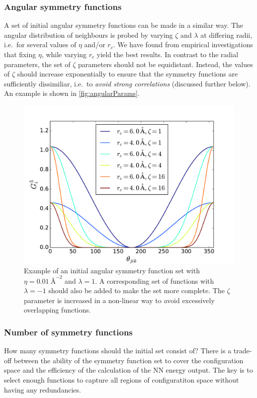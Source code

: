 \documentclass[twoside,english]{uiofysmaster}
\begin{document}
\subsubsection{Angular symmetry functions}
A set of initial angular symmetry functions can be made in a similar way. 
The angular distribution of neighbours is probed by varying $\zeta$ and $\lambda$ at differing radii, i.e.\ for 
several values of $\eta$ and/or $r_c$. 
We have found from empirical investigations that fixing $\eta$, while varying $r_c$ yield the best results. 
In contrast to the radial parameters, the set of $\zeta$ parameters should not be equidistant. Instead, the values of $\zeta$
should increase exponentially to ensure that the symmetry functions are sufficiently dissimiliar, i.e.\ to \textit{avoid
strong correlations} (discussed further below).  An example is shown in \autoref{fig:angularParams}. 
\begin{figure}
\centering
  \includegraphics[width = 0.7\linewidth]{Figures/Implementation/angularParams1.pdf}
  \caption{Example of an initial angular symmetry function set
  with $\eta = \SI{0.01}{\angstrom}^{-2}$ and 
  $\lambda = 1$. A corresponding set of functions with $\lambda = -1$ should also be added to make the set more complete. 
  The $\zeta$ parameter is increased in a non-linear way to avoid excessively overlapping functions. }
  \label{fig:angularParams}
\end{figure}

\subsubsection{Number of symmetry functions}
How many symmetry functions should the initial set consist of?
There is a trade-off between the ability of the symmetry function set to cover the configuration space and 
the efficiency of the calculation of the NN energy output. The key is to select enough functions to capture 
all regions of configuratiton space without having any redundancies. 
\end{document}
